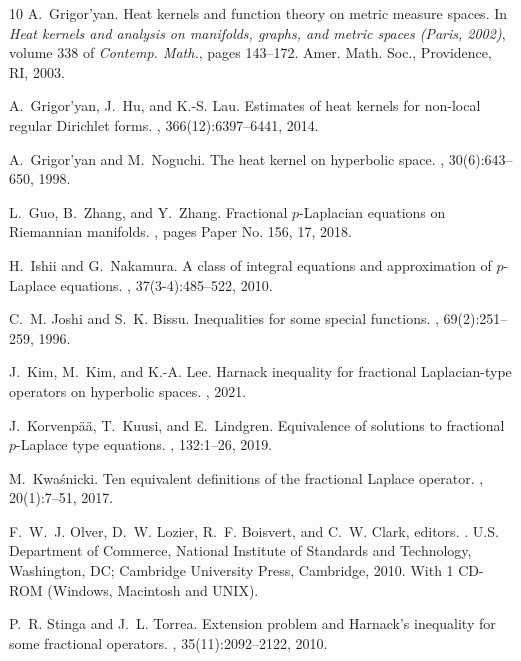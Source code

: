 \documentclass[11pt]{amsart}
\theoremstyle{plain}
\theoremstyle{definition}
\numberwithin{equation}{section}
\begin{document}
\begin{thebibliography}{10}
A.~Grigor'yan.
\newblock Heat kernels and function theory on metric measure spaces.
\newblock In {\em Heat kernels and analysis on manifolds, graphs, and metric
  spaces ({P}aris, 2002)}, volume 338 of {\em Contemp. Math.}, pages 143--172.
  Amer. Math. Soc., Providence, RI, 2003.

A.~Grigor'yan, J.~Hu, and K.-S. Lau.
\newblock Estimates of heat kernels for non-local regular {D}irichlet forms.
, 366(12):6397--6441, 2014.

A.~Grigor'yan and M.~Noguchi.
\newblock The heat kernel on hyperbolic space.
, 30(6):643--650, 1998.

L.~Guo, B.~Zhang, and Y.~Zhang.
\newblock Fractional {$p$}-{L}aplacian equations on {R}iemannian manifolds.
, pages Paper No. 156, 17,
  2018.

H.~Ishii and G.~Nakamura.
\newblock A class of integral equations and approximation of {$p$}-{L}aplace
  equations.
, 37(3-4):485--522,
  2010.

C.~M. Joshi and S.~K. Bissu.
\newblock Inequalities for some special functions.
, 69(2):251--259, 1996.

J.~Kim, M.~Kim, and K.-A. Lee.
\newblock Harnack inequality for fractional {L}aplacian-type operators on
  hyperbolic spaces.
, 2021.

J.~Korvenp\"a\"a, T.~Kuusi, and E.~Lindgren.
\newblock Equivalence of solutions to fractional {$p$}-{L}aplace type
  equations.
, 132:1--26, 2019.

M.~Kwa\'{s}nicki.
\newblock Ten equivalent definitions of the fractional {L}aplace operator.
, 20(1):7--51, 2017.

F.~W.~J. Olver, D.~W. Lozier, R.~F. Boisvert, and C.~W. Clark, editors.
.
\newblock U.S. Department of Commerce, National Institute of Standards and
  Technology, Washington, DC; Cambridge University Press, Cambridge, 2010.
\newblock With 1 CD-ROM (Windows, Macintosh and UNIX).

P.~R. Stinga and J.~L. Torrea.
\newblock Extension problem and {H}arnack's inequality for some fractional
  operators.
, 35(11):2092--2122, 2010.

\end{thebibliography}

%
%
\end{document}
